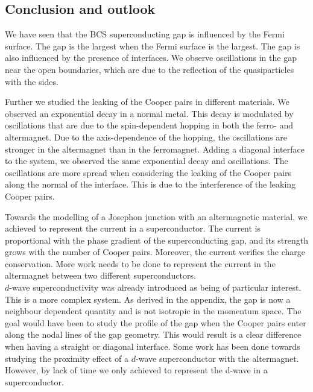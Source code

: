 \documentclass[..\main.tex]{subfile}
\begin{document}
\subsection{Conclusion and outlook}
We have seen that the BCS superconducting gap is influenced by the Fermi surface. The gap is the largest when the Fermi surface is the largest.
The gap is also influenced by the presence of interfaces. We observe oscillations in the gap near the open boundaries, which are due to the reflection
of the quasiparticles with the sides.

Further we studied the leaking of the Cooper pairs in different materials. We observed an exponential decay in a normal metal.
This decay is modulated by oscillations that are due to the spin-dependent hopping in both the ferro- and altermagnet.
Due to the axis-dependence of the hopping, the oscillations are stronger in the altermagnet than in the ferromagnet.
Adding a diagonal interface to the system, we observed the same exponential decay and oscillations. The oscillations are more spread when considering
the leaking of the Cooper pairs along the normal of the interface. This is due to the interference of the leaking Cooper pairs.

Towards the modelling of a Josephon junction with an altermagnetic material, we achieved to represent the current in a superconductor.
The current is proportional with the phase gradient of the superconducting gap, and its strength grows with the number of Cooper pairs.
Moreover, the current verifies the charge conservation.
More work needs to be done to represent the current in the altermagnet between two different superconductors.\\

$d$-wave superconductivity was already introduced as being of particular interest. This is a more complex system.
As derived in the appendix, the gap is now a neighbour dependent quantity and is not isotropic in the momentum space. The goal would have been 
to study the profile of the gap when the Cooper pairs enter along the nodal lines of the gap geometry. This
would result is a clear difference when having a straight or diagonal interface. 
 Some work has been done towards studying the
proximity effect of a $d$-wave superconductor with the altermagnet. However, by lack of time we only achieved to represent the d-wave in a superconductor.
\end{document}
